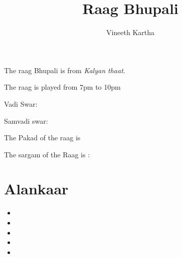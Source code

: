 \documentclass{hindustani}
\begin{document}
\title{Raag Bhupali}
\author{Vineeth Kartha}
\date{}
\maketitle

The raag Bhupali is from \textit{Kalyan thaat}.

The raag is played from 7pm to 10pm

Vadi Swar: \Ga  

Samvadi swar: \Dha


The Pakad of the raag is   

The sargam of the Raag is :




\section{Alankaar}
\begin{itemize}

\item {}
\item {}
\item {}
\item {}
\item {}

\end{itemize}

\matra{\sa \Ri}

\kan{\Dha}{\pa}
\end{document}
